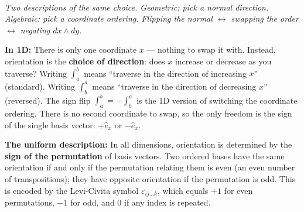 \documentclass[11pt]{report}
\newcommand{\figcap}[1]{\\[1.5mm]\parbox{0.92\textwidth}{\small\itshape #1}}
\begin{document}
\begin{center}
%
\figcap{Two descriptions of the same choice. Geometric: pick a normal direction. Algebraic: pick a coordinate ordering. Flipping the normal $\leftrightarrow$ swapping the order $\leftrightarrow$ negating $dx \wedge dy$.}
\end{center}

\textbf{In 1D:} There is only one coordinate $x$ --- nothing to swap it with. Instead, orientation is the \textbf{choice of direction}: does $x$ increase or decrease as you traverse? Writing $\int_a^b$ means ``traverse in the direction of increasing $x$'' (standard). Writing $\int_b^a$ means ``traverse in the direction of decreasing $x$'' (reversed). The sign flip $\int_a^b = -\int_b^a$ is the 1D version of switching the coordinate ordering. There is no second coordinate to swap, so the only freedom is the sign of the single basis vector: $+\hat{e}_x$ or $-\hat{e}_x$.

\textbf{The uniform description:} In all dimensions, orientation is determined by the \textbf{sign of the permutation} of basis vectors. Two ordered bases have the same orientation if and only if the permutation relating them is even (an even number of transpositions); they have opposite orientation if the permutation is odd. This is encoded by the Levi-Civita symbol $\varepsilon_{ij\ldots k}$, which equals $+1$ for even permutations, $-1$ for odd, and $0$ if any index is repeated.
\end{document}
